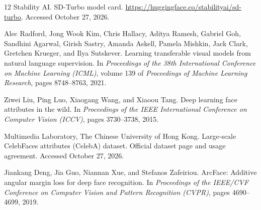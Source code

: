 \documentclass[11pt,a4paper]{article}
\begin{document}
\begin{thebibliography}{12}
Stability AI.
\newblock SD-Turbo model card.
\newblock \url{https://huggingface.co/stabilityai/sd-turbo}. Accessed October 27, 2026.

Alec Radford, Jong Wook Kim, Chris Hallacy, Aditya Ramesh, Gabriel Goh, Sandhini Agarwal, Girish Sastry, Amanda Askell, Pamela Mishkin, Jack Clark, Gretchen Krueger, and Ilya Sutskever.
\newblock Learning transferable visual models from natural language supervision.
\newblock In \emph{Proceedings of the 38th International Conference on Machine Learning (ICML)}, volume 139 of \emph{Proceedings of Machine Learning Research}, pages 8748--8763, 2021.

Ziwei Liu, Ping Luo, Xiaogang Wang, and Xiaoou Tang.
\newblock Deep learning face attributes in the wild.
\newblock In \emph{Proceedings of the IEEE International Conference on Computer Vision (ICCV)}, pages 3730--3738, 2015.

Multimedia Laboratory, The Chinese University of Hong Kong.
\newblock Large-scale CelebFaces attributes (CelebA) dataset.
\newblock Official dataset page and usage agreement. Accessed October 27, 2026.

Jiankang Deng, Jia Guo, Niannan Xue, and Stefanos Zafeiriou.
\newblock ArcFace: Additive angular margin loss for deep face recognition.
\newblock In \emph{Proceedings of the IEEE/CVF Conference on Computer Vision and Pattern Recognition (CVPR)}, pages 4690--4699, 2019.

\end{thebibliography}
\end{document}
